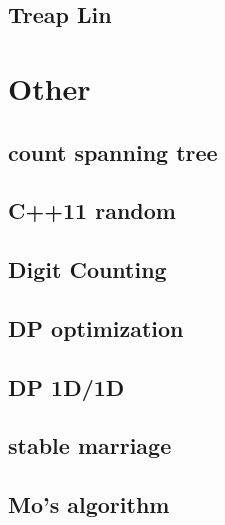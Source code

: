 	\subsection{Treap Lin}
		

\section{Other}
	\subsection{count spanning tree}
		
	\subsection{C++11 random}
		
%		
	\subsection{Digit Counting}
		
	\subsection{DP optimization}
		
	\subsection{DP 1D/1D}
		
%		
%		
	\subsection{stable marriage}
		
	\subsection{Mo's algorithm}
		

